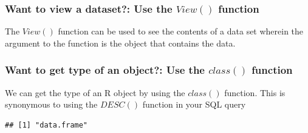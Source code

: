 \subsubsection{Want to view a dataset?: Use the $View()$ function}
\noindent The $View()$ function can be used to see the contents of a data set wherein the argument to the function is the object that contains the data.
\begin{knitrout}
\color{fgcolor}\begin{kframe}
\begin{alltt}
\end{alltt}
\end{kframe}
\end{knitrout}
\subsubsection{Want to get type of an object?: Use the $class()$ function}
\noindent We can get the type of an R object by using the $class()$ function. This is synonymous to using the $DESC()$ function in your SQL query  
\begin{knitrout}
\color{fgcolor}\begin{kframe}
\begin{alltt}
\end{alltt}
\begin{verbatim}
## [1] "data.frame"
\end{verbatim}
\end{kframe}
\end{knitrout}
